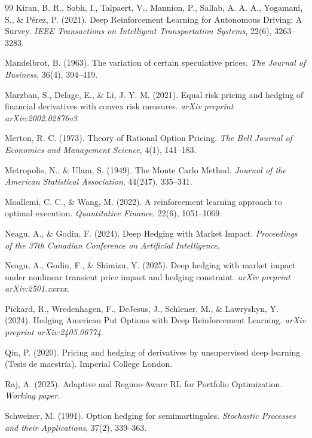 \documentclass[11pt,a4paper,spanish]{article}
\numberwithin{equation}{section} %
\begin{document}
\begin{thebibliography}{99}
 Kiran, B. R., Sobh, I., Talpaert, V., Mannion, P., Sallab, A. A. A., Yogamani, S., \& Pérez, P. (2021). Deep Reinforcement Learning for Autonomous Driving: A Survey. \textit{IEEE Transactions on Intelligent Transportation Systems}, 22(6), 3263--3283.

 Mandelbrot, B. (1963). The variation of certain speculative prices. \textit{The Journal of Business}, 36(4), 394--419.

 Marzban, S., Delage, E., \& Li, J. Y. M. (2021). Equal risk pricing and hedging of financial derivatives with convex risk measures. \textit{arXiv preprint arXiv:2002.02876v3}.

 Merton, R. C. (1973). Theory of Rational Option Pricing. \textit{The Bell Journal of Economics and Management Science}, 4(1), 141--183.

 Metropolis, N., \& Ulam, S. (1949). The Monte Carlo Method. \textit{Journal of the American Statistical Association}, 44(247), 335--341.

 Moallemi, C. C., \& Wang, M. (2022). A reinforcement learning approach to optimal execution. \textit{Quantitative Finance}, 22(6), 1051--1069.

 Neagu, A., \& Godin, F. (2024). Deep Hedging with Market Impact. \textit{Proceedings of the 37th Canadian Conference on Artificial Intelligence}.

 Neagu, A., Godin, F., \& Shimizu, Y. (2025). Deep hedging with market impact under nonlinear transient price impact and hedging constraint. \textit{arXiv preprint arXiv:2501.xxxxx}.

 Pickard, R., Wredenhagen, F., DeJesus, J., Schlener, M., \& Lawryshyn, Y. (2024). Hedging American Put Options with Deep Reinforcement Learning. \textit{arXiv preprint arXiv:2405.06774}.

 Qin, P. (2020). Pricing and hedging of derivatives by unsupervised deep learning (Tesis de maestría). Imperial College London.

 Raj, A. (2025). Adaptive and Regime-Aware RL for Portfolio Optimization. \textit{Working paper}.

 Schweizer, M. (1991). Option hedging for semimartingales. \textit{Stochastic Processes and their Applications}, 37(2), 339--363.


\end{thebibliography}
\end{document}
